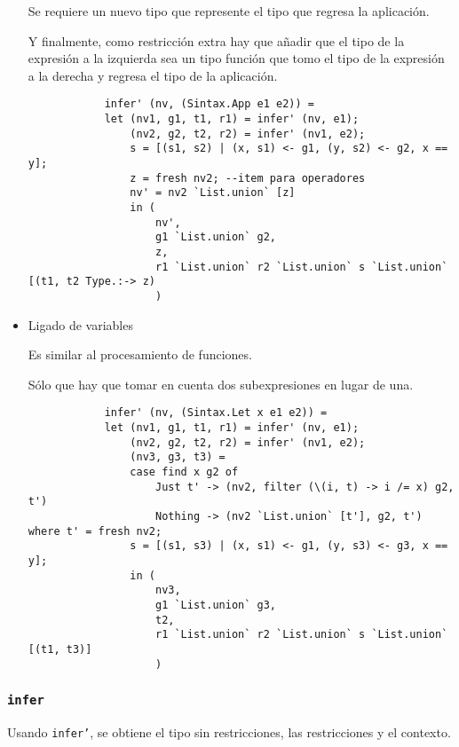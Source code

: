 \documentclass{article}
\begin{document}
\begin{itemize}
        Se requiere un nuevo tipo que represente el tipo que regresa la
        aplicación.

        Y finalmente, como restricción extra hay que añadir que el tipo de la
        expresión a la izquierda sea un tipo función que tomo el tipo de la
        expresión a la derecha y regresa el tipo de la aplicación.

        \begin{verbatim}
            infer' (nv, (Sintax.App e1 e2)) = 
            let (nv1, g1, t1, r1) = infer' (nv, e1);
                (nv2, g2, t2, r2) = infer' (nv1, e2);
                s = [(s1, s2) | (x, s1) <- g1, (y, s2) <- g2, x == y];
                z = fresh nv2; --item para operadores
                nv' = nv2 `List.union` [z]
                in (
                    nv', 
                    g1 `List.union` g2, 
                    z, 
                    r1 `List.union` r2 `List.union` s `List.union` [(t1, t2 Type.:-> z)
                    )
        \end{verbatim}

        \item Ligado de variables

        Es similar al procesamiento de funciones.

        Sólo que hay que tomar en cuenta dos subexpresiones en lugar de una.

        \begin{verbatim}
            infer' (nv, (Sintax.Let x e1 e2)) = 
            let (nv1, g1, t1, r1) = infer' (nv, e1);
                (nv2, g2, t2, r2) = infer' (nv1, e2);
                (nv3, g3, t3) =
                case find x g2 of
                    Just t' -> (nv2, filter (\(i, t) -> i /= x) g2, t')
                    Nothing -> (nv2 `List.union` [t'], g2, t') where t' = fresh nv2;
                s = [(s1, s3) | (x, s1) <- g1, (y, s3) <- g3, x == y];
                in (
                    nv3, 
                    g1 `List.union` g3, 
                    t2, 
                    r1 `List.union` r2 `List.union` s `List.union` [(t1, t3)]
                    )
        \end{verbatim}
    \end{itemize}

    \subsubsection{\texttt{infer}}

    Usando \texttt{infer'}, se obtiene el tipo sin restricciones, las
    restricciones y el contexto.
\end{document}
